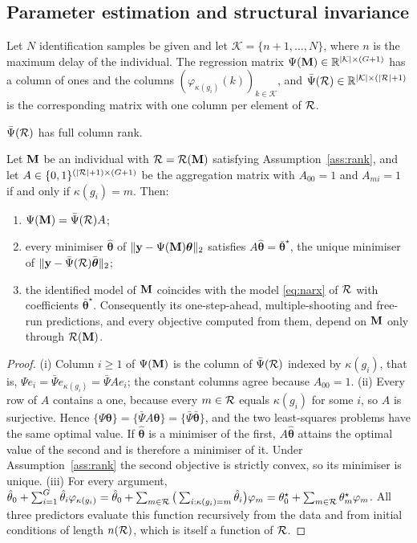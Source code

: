 \subsection{Parameter estimation and structural invariance}
Let $N$ identification samples be given and let $\mathcal K=\{n+1,\dots,N\}$, where $n$ is the maximum delay of
the individual. The regression matrix $\Psi(\mathbf{M})\in\mathbb{R}^{|\mathcal K|\times(G+1)}$ has a column of ones and the columns
$(\varphi_{\kappa(g_i)}(k))_{k\in\mathcal K}$, and $\bar\Psi(\mathcal{R})\in\mathbb{R}^{|\mathcal K|\times(|\mathcal{R}|+1)}$ is the
corresponding matrix with one column per element of $\mathcal{R}$.

\begin{assumption}[Identifiability]\label{ass:rank}
$\bar\Psi(\mathcal{R})$ has full column rank.
\end{assumption}

\begin{theorem}\label{thm:invariance}
Let $\mathbf{M}$ be an individual with $\mathcal{R}=\mathcal{R}(\mathbf{M})$ satisfying Assumption~\ref{ass:rank}, and let
$A\in\{0,1\}^{(|\mathcal{R}|+1)\times(G+1)}$ be the aggregation matrix with $A_{00}=1$ and $A_{mi}=1$ if and only if
$\kappa(g_i)=m$. Then:
\begin{enumerate}
\item[(i)] $\Psi(\mathbf{M})=\bar\Psi(\mathcal{R})A$;
\item[(ii)] every minimiser $\hat{\boldsymbol\theta}$ of $\|\mathbf y-\Psi(\mathbf{M})\boldsymbol\theta\|_2$ satisfies
$A\hat{\boldsymbol\theta}=\bar{\boldsymbol\theta}^\star$, the unique minimiser of
$\|\mathbf y-\bar\Psi(\mathcal{R})\bar{\boldsymbol\theta}\|_2$;
\item[(iii)] the identified model of $\mathbf{M}$ coincides with the model \eqref{eq:narx} of $\mathcal{R}$ with coefficients
$\bar{\boldsymbol\theta}^\star$. Consequently its one-step-ahead, multiple-shooting and free-run predictions, and
every objective computed from them, depend on $\mathbf{M}$ only through $\mathcal{R}(\mathbf{M})$.
\end{enumerate}
\end{theorem}
\begin{proof}
(i) Column $i\ge1$ of $\Psi(\mathbf{M})$ is the column of $\bar\Psi(\mathcal{R})$ indexed by $\kappa(g_i)$, that is,
$\Psi e_i=\bar\Psi e_{\kappa(g_i)}=\bar\Psi Ae_i$; the constant columns agree because $A_{00}=1$.
(ii) Every row of $A$ contains a one, because every $m\in\mathcal{R}$ equals $\kappa(g_i)$ for some $i$, so $A$ is
surjective. Hence $\{\Psi\boldsymbol\theta\}=\{\bar\Psi A\boldsymbol\theta\}=\{\bar\Psi\bar{\boldsymbol\theta}\}$,
and the two least-squares problems have the same optimal value. If $\hat{\boldsymbol\theta}$ is a minimiser of the
first, $A\hat{\boldsymbol\theta}$ attains the optimal value of the second and is therefore a minimiser of it. Under
Assumption~\ref{ass:rank} the second objective is strictly convex, so its minimiser is unique.
(iii) For every argument,
$\hat\theta_0+\sum_{i=1}^{G}\hat\theta_i\varphi_{\kappa(g_i)}=\hat\theta_0+\sum_{m\in\mathcal{R}}\big(\sum_{i:\kappa(g_i)=m}\hat\theta_i\big)\varphi_m
=\theta^\star_0+\sum_{m\in\mathcal{R}}\theta^\star_m\varphi_m$. All three predictors evaluate this function recursively from
the data and from initial conditions of length $n(\mathcal{R})$, which is itself a function of $\mathcal{R}$.
\end{proof}

